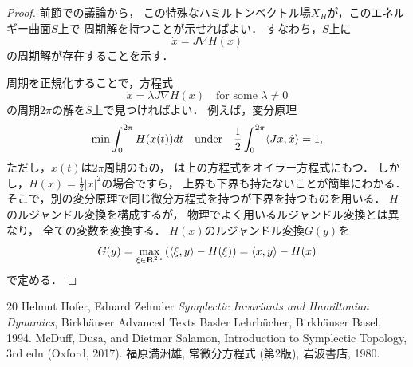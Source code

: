 \begin{proof}
    前節での議論から，
    この特殊なハミルトンベクトル場\(X_H\)が，このエネルギー曲面\(S\)上で
    周期解を持つことが示せればよい．
    すなわち，\(S\)上に
    \[
        \dot{x}=J\nabla H(x)
    \]
    の周期解が存在することを示す．

    周期を正規化することで，方程式
    \begin{equation}
        \dot{x}=\lambda J\nabla H(x) \quad \text{for some \(\lambda\ne0\)}
    \end{equation}
    の周期\(2\pi\)の解を\(S\)上で見つければよい．
    例えば，変分原理
    \[
        \min\int_{0}^{2\pi}H(x(t))dt 
        \quad
        \text{under}
        \quad
        \frac{1}{2}
        \int_{0}^{2\pi}\inner<Jx,\dot{x}>=1,
    \]
    ただし，\(x(t)\)は\(2\pi\)周期のもの，
    は上の方程式をオイラー方程式にもつ．
    しかし，\(H(x)=\frac{1}{2}\lvert{x}\rvert^2\)の場合ですら，
    上界も下界も持たないことが簡単にわかる．
    そこで，別の変分原理で同じ微分方程式を持つが下界を持つものを用いる．
    \(H\)のルジャンドル変換を構成するが，
    物理でよく用いるルジャンドル変換とは異なり，
    全ての変数を変換する．
    \(H(x)\)のルジャンドル変換\(G(y)\)を
    \[
        G(y)=\max_{\xi\in\rr^{2n}}\left(
            \inner<\xi,y>-H(\xi)
        \right)
        =\inner<x,y>-H(x)
    \]
    で定める．
\end{proof}

\begin{thebibliography}{20} 
    Helmut Hofer, Eduard Zehnder
    \textit{Symplectic Invariants and Hamiltonian Dynamics}, 
    Birkh\"auser Advanced Texts Basler Lehrb\"ucher, Birkh\"auser Basel, 1994.
     McDuff, Dusa, 
    and Dietmar Salamon, 
    Introduction to Symplectic Topology, 
    3rd edn (Oxford, 2017).
     福原満洲雄, 常微分方程式 (第2版), 岩波書店, 1980.
\end{thebibliography}





